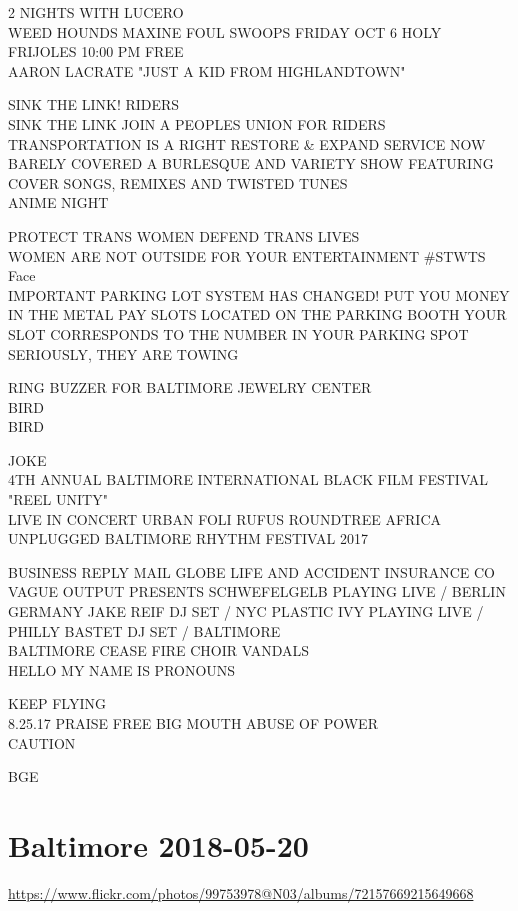 \documentclass[10pt,letterpaper]{article}
\begin{document}
2 NIGHTS WITH LUCERO\\
WEED HOUNDS MAXINE FOUL SWOOPS FRIDAY OCT 6 HOLY FRIJOLES 10:00 PM FREE\\
AARON LACRATE "JUST A KID FROM HIGHLANDTOWN"

SINK THE LINK!  RIDERS\\
SINK THE LINK JOIN A PEOPLES UNION FOR RIDERS TRANSPORTATION IS A RIGHT RESTORE \& EXPAND SERVICE NOW\\
BARELY COVERED A BURLESQUE AND VARIETY SHOW FEATURING COVER SONGS, REMIXES AND TWISTED TUNES\\
ANIME NIGHT

PROTECT TRANS WOMEN DEFEND TRANS LIVES\\
WOMEN ARE NOT OUTSIDE FOR YOUR ENTERTAINMENT \#STWTS\\
Face\\
IMPORTANT PARKING LOT SYSTEM HAS CHANGED!  PUT YOU MONEY IN THE METAL PAY SLOTS LOCATED ON THE PARKING BOOTH YOUR SLOT CORRESPONDS TO THE NUMBER IN YOUR PARKING SPOT SERIOUSLY, THEY ARE TOWING

RING BUZZER FOR BALTIMORE JEWELRY CENTER\\
BIRD\\
BIRD

JOKE\\
4TH ANNUAL BALTIMORE INTERNATIONAL BLACK FILM FESTIVAL "REEL UNITY"\\
LIVE IN CONCERT URBAN FOLI RUFUS ROUNDTREE AFRICA UNPLUGGED BALTIMORE RHYTHM FESTIVAL 2017

BUSINESS REPLY MAIL GLOBE LIFE AND ACCIDENT INSURANCE CO\\
VAGUE OUTPUT PRESENTS SCHWEFELGELB  PLAYING LIVE / BERLIN GERMANY JAKE REIF DJ SET / NYC PLASTIC IVY PLAYING LIVE / PHILLY BASTET DJ SET / BALTIMORE\\
BALTIMORE CEASE FIRE CHOIR VANDALS\\
HELLO MY NAME IS PRONOUNS

KEEP FLYING\\
8.25.17 PRAISE FREE BIG MOUTH ABUSE OF POWER\\
CAUTION

BGE


\section*{Baltimore 2018-05-20}

\url{https://www.flickr.com/photos/99753978@N03/albums/72157669215649668}
\end{document}
